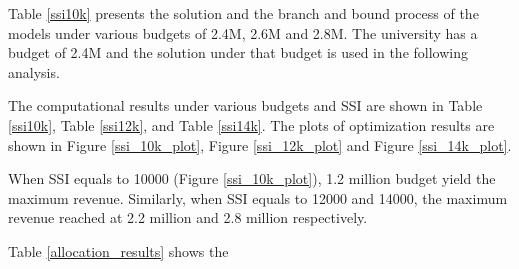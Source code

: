 \documentclass[12pt,english]{report}
\begin{document}
Table \ref{ssi10k}  presents the solution and the branch and bound process
of the models under various budgets of 2.4M, 2.6M and 2.8M. 
The university has a budget of 2.4M and the solution under that budget is used
in the following analysis.

The computational results under various budgets and SSI are shown in Table
\ref{ssi10k}, Table \ref{ssi12k}, and Table \ref{ssi14k}.
The plots of optimization results are shown in  Figure \ref{ssi_10k_plot},
Figure \ref{ssi_12k_plot} and Figure \ref{ssi_14k_plot}.


When SSI equals to 10000 (Figure \ref{ssi_10k_plot}), 1.2 million budget yield
the maximum revenue. Similarly, when SSI equals to 12000 and 14000, the maximum
revenue reached at 2.2 million and 2.8 million respectively.

Table \ref{allocation_results} shows the 

%
%
\end{document}
